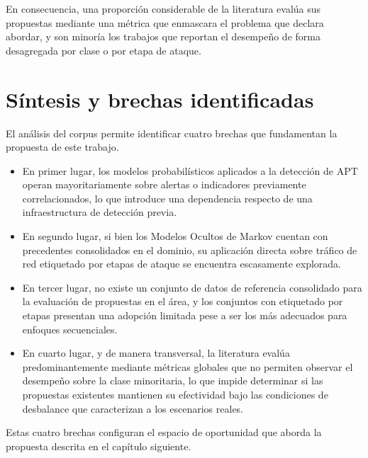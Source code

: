 En consecuencia, una proporción considerable de la literatura evalúa sus propuestas mediante una métrica que enmascara el problema que declara abordar, y son minoría los trabajos que reportan el desempeño de forma desagregada por clase o por etapa de ataque.

\section{Síntesis y brechas identificadas}

El análisis del corpus permite identificar cuatro brechas que fundamentan la propuesta de este trabajo.

\begin{itemize}
    \item En primer lugar, los modelos probabilísticos aplicados a la detección de APT operan mayoritariamente sobre alertas o indicadores previamente correlacionados, lo que introduce una dependencia respecto de una infraestructura de detección previa.
    \item En segundo lugar, si bien los Modelos Ocultos de Markov cuentan con precedentes consolidados en el dominio, su aplicación directa sobre tráfico de red etiquetado por etapas de ataque se encuentra escasamente explorada.
    \item En tercer lugar, no existe un conjunto de datos de referencia consolidado para la evaluación de propuestas en el área, y los conjuntos con etiquetado por etapas presentan una adopción limitada pese a ser los más adecuados para enfoques secuenciales.
    \item En cuarto lugar, y de manera transversal, la literatura evalúa predominantemente mediante métricas globales que no permiten observar el desempeño sobre la clase minoritaria, lo que impide determinar si las propuestas existentes mantienen su efectividad bajo las condiciones de desbalance que caracterizan a los escenarios reales.
\end{itemize}

Estas cuatro brechas configuran el espacio de oportunidad que aborda la propuesta descrita en el capítulo siguiente.